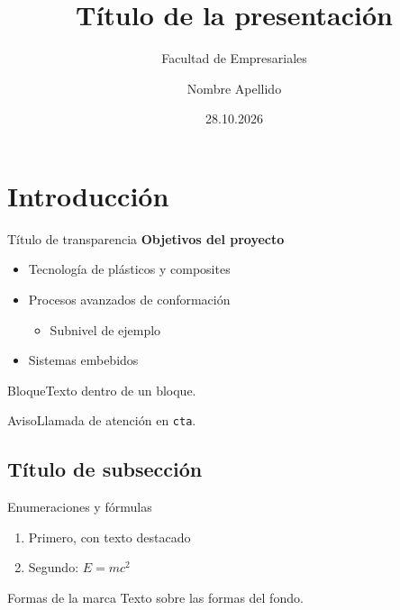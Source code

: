 \documentclass[aspectratio=169,11pt]{beamer}
\title{Título de la presentación}
\subtitle{Facultad de Empresariales}
\author{Nombre Apellido}
\date{28.10.2026}
\begin{document}
\begin{frame}[plain]
  \titlepage
\end{frame}

\section{Introducción}

\begin{frame}{Título de transparencia}
  \textbf{Objetivos del proyecto}
  \begin{itemize}
    \item Tecnología de plásticos y composites
    \item Procesos avanzados de conformación
    \begin{itemize}\item Subnivel de ejemplo\end{itemize}
    \item Sistemas embebidos
  \end{itemize}
  \begin{block}{Bloque}Texto dentro de un bloque.\end{block}
  \begin{alertblock}{Aviso}Llamada de atención en \texttt{cta}.\end{alertblock}
\end{frame}

\subsection{Título de subsección}

\begin{frame}{Enumeraciones y fórmulas}
  \begin{enumerate}
    \item Primero, con \alert{texto destacado}
    \item Segundo: $E = mc^2$
  \end{enumerate}
\end{frame}

\begin{frame}{Formas de la marca}
  Texto sobre las formas del fondo.
\end{frame}


\end{document}
